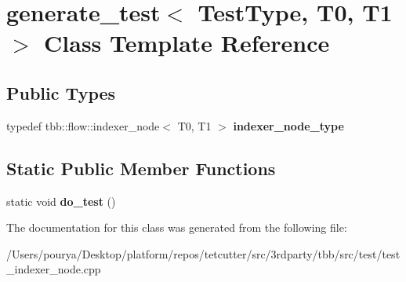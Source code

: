 \hypertarget{classgenerate__test_3_01TestType_00_01T0_00_01T1_01_4}{}\section{generate\+\_\+test$<$ Test\+Type, T0, T1 $>$ Class Template Reference}
\label{classgenerate__test_3_01TestType_00_01T0_00_01T1_01_4}
\subsection*{Public Types}
\begin{DoxyCompactItemize}
\item 
\hypertarget{classgenerate__test_3_01TestType_00_01T0_00_01T1_01_4_a7f050f152acb340f47188376a265eb9d}{}typedef tbb\+::flow\+::indexer\+\_\+node$<$ T0, T1 $>$ {\bfseries indexer\+\_\+node\+\_\+type}\label{classgenerate__test_3_01TestType_00_01T0_00_01T1_01_4_a7f050f152acb340f47188376a265eb9d}

\end{DoxyCompactItemize}
\subsection*{Static Public Member Functions}
\begin{DoxyCompactItemize}
\item 
\hypertarget{classgenerate__test_3_01TestType_00_01T0_00_01T1_01_4_ac79b507640b72696e27a642aa665f057}{}static void {\bfseries do\+\_\+test} ()\label{classgenerate__test_3_01TestType_00_01T0_00_01T1_01_4_ac79b507640b72696e27a642aa665f057}

\end{DoxyCompactItemize}


The documentation for this class was generated from the following file\+:\begin{DoxyCompactItemize}
\item 
/\+Users/pourya/\+Desktop/platform/repos/tetcutter/src/3rdparty/tbb/src/test/test\+\_\+indexer\+\_\+node.\+cpp\end{DoxyCompactItemize}
